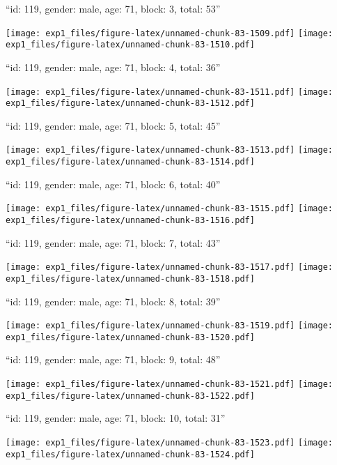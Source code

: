 \documentclass[11pt,,]{article}
\begin{document}
\newpage
[1] 

``id: 119, gender: male, age: 71, block: 3, total: 53''

\texttt{[image: exp1\_files/figure-latex/unnamed-chunk-83-1509.pdf]}
\texttt{[image: exp1\_files/figure-latex/unnamed-chunk-83-1510.pdf]}

\newpage
[1] 

``id: 119, gender: male, age: 71, block: 4, total: 36''

\texttt{[image: exp1\_files/figure-latex/unnamed-chunk-83-1511.pdf]}
\texttt{[image: exp1\_files/figure-latex/unnamed-chunk-83-1512.pdf]}

\newpage
[1] 

``id: 119, gender: male, age: 71, block: 5, total: 45''

\texttt{[image: exp1\_files/figure-latex/unnamed-chunk-83-1513.pdf]}
\texttt{[image: exp1\_files/figure-latex/unnamed-chunk-83-1514.pdf]}

\newpage
[1] 

``id: 119, gender: male, age: 71, block: 6, total: 40''

\texttt{[image: exp1\_files/figure-latex/unnamed-chunk-83-1515.pdf]}
\texttt{[image: exp1\_files/figure-latex/unnamed-chunk-83-1516.pdf]}

\newpage
[1] 

``id: 119, gender: male, age: 71, block: 7, total: 43''

\texttt{[image: exp1\_files/figure-latex/unnamed-chunk-83-1517.pdf]}
\texttt{[image: exp1\_files/figure-latex/unnamed-chunk-83-1518.pdf]}

\newpage
[1] 

``id: 119, gender: male, age: 71, block: 8, total: 39''

\texttt{[image: exp1\_files/figure-latex/unnamed-chunk-83-1519.pdf]}
\texttt{[image: exp1\_files/figure-latex/unnamed-chunk-83-1520.pdf]}

\newpage
[1] 

``id: 119, gender: male, age: 71, block: 9, total: 48''

\texttt{[image: exp1\_files/figure-latex/unnamed-chunk-83-1521.pdf]}
\texttt{[image: exp1\_files/figure-latex/unnamed-chunk-83-1522.pdf]}

\newpage
[1] 

``id: 119, gender: male, age: 71, block: 10, total: 31''

\texttt{[image: exp1\_files/figure-latex/unnamed-chunk-83-1523.pdf]}
\texttt{[image: exp1\_files/figure-latex/unnamed-chunk-83-1524.pdf]}
\end{document}

